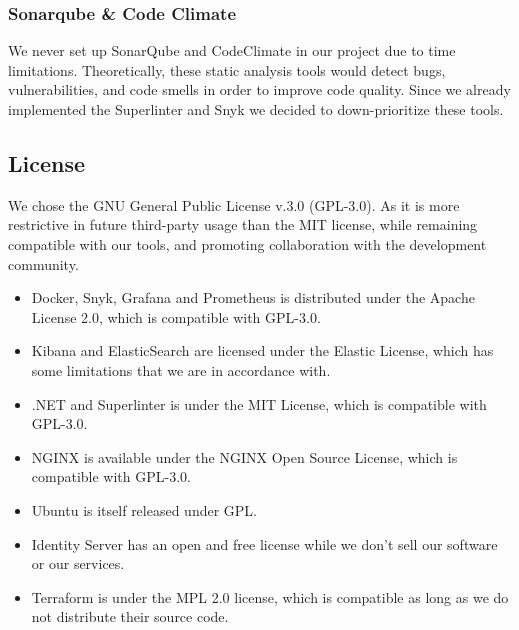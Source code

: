 \subsubsection{Sonarqube \& Code Climate}
We never set up SonarQube and CodeClimate in our project due to time limitations. Theoretically, these static analysis tools would detect bugs, vulnerabilities, and code smells in order to improve code quality. Since we already implemented the Superlinter and Snyk we decided to down-prioritize these tools.

\subsection{License}

We chose the GNU General Public License v.3.0 (GPL-3.0). As it is more restrictive in future third-party usage than the MIT license, while remaining compatible with our tools, and promoting collaboration with the development community.

\begin{itemize}
    \item Docker, Snyk, Grafana and Prometheus is distributed under the Apache License 2.0, which is compatible with GPL-3.0.
    \item Kibana and ElasticSearch are licensed under the Elastic License, which has some limitations that we are in accordance with.
    \item .NET and Superlinter is under the MIT License, which is compatible with GPL-3.0.
    \item NGINX is available under the NGINX Open Source License, which is compatible with GPL-3.0.
    \item Ubuntu is itself released under GPL.
    \item Identity Server has an open and free license while we don't sell our software or our services.
    \item Terraform is under the MPL 2.0 license, which is compatible as long as we do not distribute their source code.
\end{itemize}
